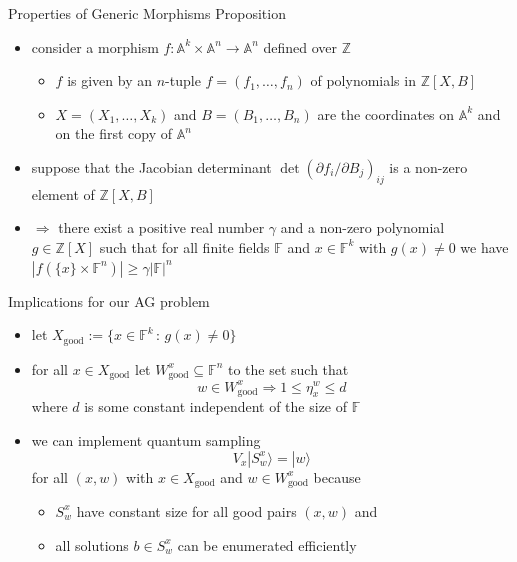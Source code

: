 \documentclass[slideColor]{prosper}
\newcommand{\F}{{\mathbb{F}}}
\newcommand{\FF}{{\mathbb F}}
\newcommand{\ZZ}{{\mathbb Z}}
\renewcommand{\AA}{{\mathbb A}}
\renewcommand{\>}{\rangle}
\newcommand{\<}{\langle}
\begin{document}

\begin{slide}{Properties of Generic Morphisms}
Proposition
\begin{itemize}
\item
consider a morphism $f:\AA^k \times \AA^n \rightarrow \AA^n$ defined
over $\ZZ$
\begin{itemize}
\item $f$ is given by an $n$-tuple $f=(f_1,\ldots,f_n)$
of polynomials in $\ZZ[X,B]$
\item $X=(X_1,\ldots,X_k)$ and
$B=(B_1,\ldots,B_n)$ are the coordinates on $\AA^k$ and on the first
copy of $\AA^n$ 
\end{itemize}
\item 
suppose that the Jacobian determinant
$\det (\partial f_i/\partial B_j)_{ij}$ is a non-zero element of
$\ZZ[X,B]$
\item $\Rightarrow$ there exist a positive real number $\gamma$ and a
non-zero polynomial $g \in \ZZ[X]$ such that for all finite fields $\FF$
and $x \in \FF^k$ with $g(x) \neq 0$ we have $|f(\{x\} \times \FF^n)|
\geq \gamma |\FF|^n$
\end{itemize}
\end{slide}


\begin{slide}{Implications for our AG problem}
\begin{itemize}
\item let $X_{\mathrm{good}}:=\{x\in\F^k \,:\, g(x)\neq 0\}$
\item for all $x\in X_{\mathrm{good}}$ let $W_{\mathrm{good}}^x\subseteq\F^n$ to the set such that
\[
w\in W_{\mathrm{good}}^x \Rightarrow 1 \le \eta_x^w \le d
\]
where $d$ is some constant independent of the size of $\F$
\item we can implement quantum sampling
\[
V_x|S_w^x\>=|w\>
\]
for all $(x,w)$ with $x\in X_{\mathrm{good}}$ and $w\in W_{\mathrm{good}}^x$ because
\begin{itemize}
\item $S_w^x$ have constant size for all good pairs $(x,w)$ and
\item all solutions $b\in S_w^x$ can be enumerated efficiently 
\end{itemize}
\end{itemize}
\end{slide}
\end{document}
